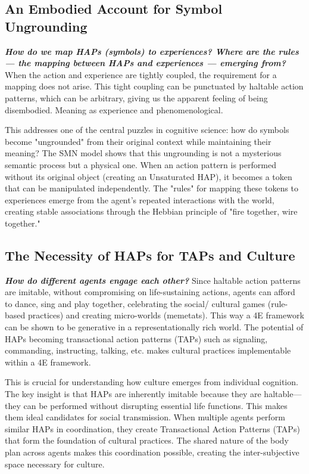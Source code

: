 \subsection{An Embodied Account for Symbol Ungrounding}
\textbf{\textit{How do we map HAPs (symbols) to experiences? Where are the rules — the mapping between HAPs and experiences — emerging from?}} When the action and experience are tightly coupled, the requirement for a mapping does not arise. This tight coupling can be punctuated by haltable action patterns, which can be arbitrary, giving us the apparent feeling of being disembodied. Meaning as experience and phenomenological.

This addresses one of the central puzzles in cognitive science: how do symbols become "ungrounded" from their original context while maintaining their meaning? The SMN model shows that this ungrounding is not a mysterious semantic process but a physical one. When an action pattern is performed without its original object (creating an Unsaturated HAP), it becomes a token that can be manipulated independently. The "rules" for mapping these tokens to experiences emerge from the agent's repeated interactions with the world, creating stable associations through the Hebbian principle of "fire together, wire together."

\subsection{The Necessity of HAPs for TAPs and Culture}
\textbf{\textit{How do different agents engage each other?}} Since haltable action patterns are imitable, without compromising on life-sustaining actions, agents can afford to dance, sing and play together, celebrating the social/ cultural games (rule-based practices) and creating micro-worlds (memetats). This way a 4E framework can be shown to be generative in a representationally rich world. The potential of HAPs becoming transactional action patterns (TAPs) such as signaling, commanding, instructing, talking, etc. makes cultural practices implementable within a 4E framework.

This is crucial for understanding how culture emerges from individual cognition. The key insight is that HAPs are inherently imitable because they are haltable—they can be performed without disrupting essential life functions. This makes them ideal candidates for social transmission. When multiple agents perform similar HAPs in coordination, they create Transactional Action Patterns (TAPs) that form the foundation of cultural practices. The shared nature of the body plan across agents makes this coordination possible, creating the inter-subjective space necessary for culture.

